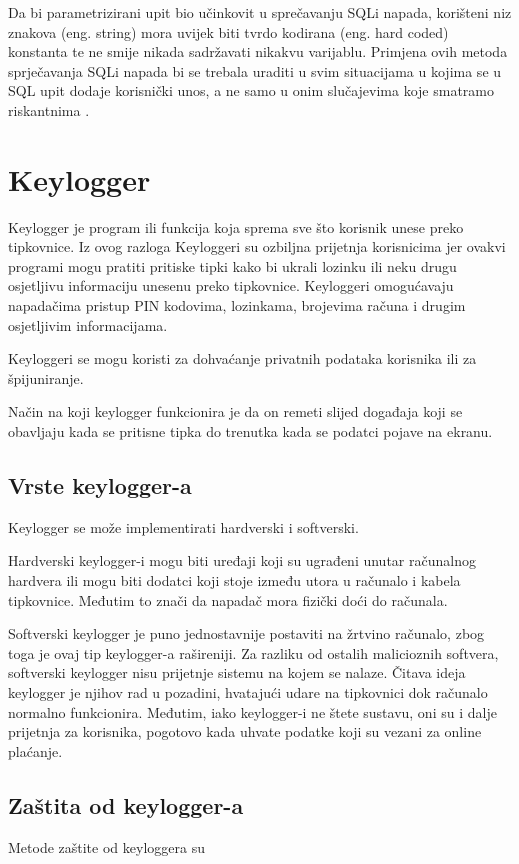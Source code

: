 \documentclass[12pt, oneside, onecolumn]{book}
\begin{document}
{Da bi parametrizirani upit bio učinkovit u sprečavanju SQLi napada, korišteni niz znakova (eng. string) mora uvijek biti tvrdo kodirana (eng. hard coded) konstanta te ne smije nikada sadržavati nikakvu varijablu. Primjena ovih metoda sprječavanja SQLi napada bi se trebala uraditi u svim situacijama u kojima se u SQL upit dodaje korisnički unos, a ne samo u onim slučajevima koje smatramo riskantnima \cite{sitesqli}.

\section{Keylogger}
Keylogger je program ili funkcija koja sprema sve što korisnik unese preko tipkovnice. Iz ovog razloga Keyloggeri su ozbiljna prijetnja korisnicima jer ovakvi programi mogu pratiti pritiske tipki kako bi ukrali lozinku ili neku drugu osjetljivu informaciju unesenu preko tipkovnice. Keyloggeri omogućavaju napadačima pristup PIN kodovima, lozinkama, brojevima računa i drugim osjetljivim informacijama.

Keyloggeri se mogu koristi za dohvaćanje privatnih podataka korisnika ili za špijuniranje.

Način na koji keylogger funkcionira je da on remeti slijed događaja koji se obavljaju kada se pritisne tipka do trenutka kada se podatci pojave na ekranu\cite{key}.

\pagebreak
\subsection{Vrste keylogger-a}

Keylogger se može implementirati hardverski i softverski. 

Hardverski keylogger-i mogu biti uređaji koji su ugrađeni unutar računalnog hardvera ili mogu biti dodatci koji stoje između utora u računalo i kabela tipkovnice. Međutim to znači da napadač mora fizički doći do računala.

Softverski keylogger je puno jednostavnije postaviti na žrtvino računalo, zbog toga je ovaj tip keylogger-a rašireniji. Za razliku od ostalih malicioznih softvera, softverski keylogger nisu prijetnje sistemu na kojem se nalaze. Čitava ideja keylogger je njihov rad u pozadini, hvatajući udare na tipkovnici dok računalo normalno funkcionira. Međutim, iako keylogger-i ne štete sustavu, oni su i dalje prijetnja za korisnika, pogotovo kada uhvate podatke koji su vezani za online plaćanje.

\subsection{Zaštita od keylogger-a}
Metode zaštite od keyloggera su \cite{key2}

}
\end{document}
